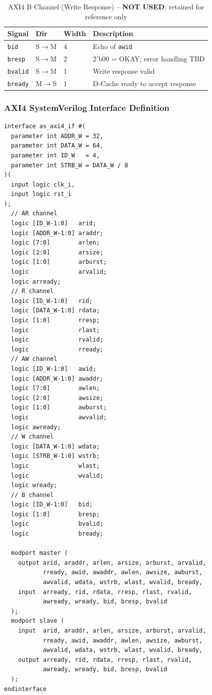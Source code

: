 \begin{table}[H]
\caption{AXI4 B Channel (Write Response) -- \textbf{NOT USED}; retained for reference only}
\label{tab:asAxi4BCh}
\centering
\begin{tabularx}{\textwidth}{|l |l |l |X|}
  \hline
  Signal & Dir & Width & Description \\
  \hline
  \hline
  \texttt{bid}    & S$\to$M & 4 & Echo of \texttt{awid} \\
  \hline
  \texttt{bresp}  & S$\to$M & 2 & 2'b00 = OKAY; error handling TBD \\
  \hline
  \texttt{bvalid} & S$\to$M & 1 & Write response valid \\
  \hline
  \texttt{bready} & M$\to$S & 1 & D-Cache ready to accept response \\
  \hline
\end{tabularx}
\end{table}

\subsubsection{AXI4 SystemVerilog Interface Definition}

\begin{verbatim}
interface as_axi4_if #(
  parameter int ADDR_W = 32,
  parameter int DATA_W = 64,
  parameter int ID_W   = 4,
  parameter int STRB_W = DATA_W / 8
)(
  input logic clk_i,
  input logic rst_i
);
  // AR channel
  logic [ID_W-1:0]   arid;    
  logic [ADDR_W-1:0] araddr;
  logic [7:0]        arlen;   
  logic [2:0]        arsize;
  logic [1:0]        arburst; 
  logic              arvalid; 
  logic arready;
  // R channel
  logic [ID_W-1:0]   rid;     
  logic [DATA_W-1:0] rdata;
  logic [1:0]        rresp;   
  logic              rlast;
  logic              rvalid;  
  logic              rready;
  // AW channel
  logic [ID_W-1:0]   awid;    
  logic [ADDR_W-1:0] awaddr;
  logic [7:0]        awlen;   
  logic [2:0]        awsize;
  logic [1:0]        awburst; 
  logic              awvalid; 
  logic awready;
  // W channel
  logic [DATA_W-1:0] wdata;   
  logic [STRB_W-1:0] wstrb;
  logic              wlast;   
  logic              wvalid; 
  logic wready;
  // B channel
  logic [ID_W-1:0]   bid;     
  logic [1:0]        bresp;
  logic              bvalid;  
  logic              bready;

  modport master (
    output arid, araddr, arlen, arsize, arburst, arvalid, 
           rready, awid, awaddr, awlen, awsize, awburst, 
           awvalid, wdata, wstrb, wlast, wvalid, bready,
    input  arready, rid, rdata, rresp, rlast, rvalid,
           awready, wready, bid, bresp, bvalid
  );
  modport slave (
    input  arid, araddr, arlen, arsize, arburst, arvalid, 
           rready, awid, awaddr, awlen, awsize, awburst, 
           awvalid, wdata, wstrb, wlast, wvalid, bready,
    output arready, rid, rdata, rresp, rlast, rvalid,
           awready, wready, bid, bresp, bvalid
  );
endinterface
\end{verbatim}

